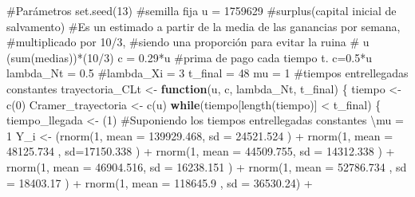 \documentclass[
  us-letterpaper,
]{scrreprt}
\newenvironment{Shaded}{\begin{snugshade}}{\end{snugshade}}
\newcommand{\AttributeTok}[1]{\textcolor[rgb]{0.40,0.45,0.13}{#1}}
\newcommand{\CommentTok}[1]{\textcolor[rgb]{0.37,0.37,0.37}{#1}}
\newcommand{\ControlFlowTok}[1]{\textcolor[rgb]{0.00,0.23,0.31}{\textbf{#1}}}
\newcommand{\DecValTok}[1]{\textcolor[rgb]{0.68,0.00,0.00}{#1}}
\newcommand{\FloatTok}[1]{\textcolor[rgb]{0.68,0.00,0.00}{#1}}
\newcommand{\FunctionTok}[1]{\textcolor[rgb]{0.28,0.35,0.67}{#1}}
\newcommand{\NormalTok}[1]{\textcolor[rgb]{0.00,0.23,0.31}{#1}}
\newcommand{\OtherTok}[1]{\textcolor[rgb]{0.00,0.23,0.31}{#1}}
\newcommand{\SpecialCharTok}[1]{\textcolor[rgb]{0.37,0.37,0.37}{#1}}
\theoremstyle{plain}
\theoremstyle{plain}
\theoremstyle{definition}
\theoremstyle{remark}
\begin{document}
\begin{Shaded}
\begin{Highlighting}[]
\CommentTok{\#Parámetros}
\FunctionTok{set.seed}\NormalTok{(}\DecValTok{13}\NormalTok{) }\CommentTok{\#semilla fija}
\NormalTok{u }\OtherTok{=} \DecValTok{1759629} \CommentTok{\#surplus(capital inicial de salvamento)}
\CommentTok{\#Es un estimado a partir de la media de las ganancias por semana, }
\CommentTok{\#multiplicado por 10/3, }
\CommentTok{\#siendo una proporción para evitar la ruina}
\CommentTok{\# u (sum(medias))*(10/3)}
\NormalTok{c }\OtherTok{=} \FloatTok{0.29}\SpecialCharTok{*}\NormalTok{u }\CommentTok{\#prima de pago cada tiempo t. c=0.5*u}
\NormalTok{lambda\_Nt }\OtherTok{=} \FloatTok{0.5}
\CommentTok{\#lambda\_Xi = 3}
\NormalTok{t\_final }\OtherTok{=} \DecValTok{48}
\NormalTok{mu }\OtherTok{=} \DecValTok{1} \CommentTok{\#tiempos entrellegadas constantes}
\NormalTok{trayectoria\_CLt }\OtherTok{\textless{}{-}} \ControlFlowTok{function}\NormalTok{(u, c, lambda\_Nt, t\_final)}
\NormalTok{\{}
\NormalTok{  tiempo }\OtherTok{\textless{}{-}} \FunctionTok{c}\NormalTok{(}\DecValTok{0}\NormalTok{)}
\NormalTok{  Cramer\_trayectoria }\OtherTok{\textless{}{-}} \FunctionTok{c}\NormalTok{(u)}
  \ControlFlowTok{while}\NormalTok{(tiempo[}\FunctionTok{length}\NormalTok{(tiempo)] }\SpecialCharTok{\textless{}}\NormalTok{ t\_final)}
\NormalTok{  \{}
\NormalTok{    tiempo\_llegada }\OtherTok{\textless{}{-}}\NormalTok{ (}\DecValTok{1}\NormalTok{) }
    \CommentTok{\#Suponiendo los tiempos entrellegadas constantes \textbackslash{}mu = 1}
\NormalTok{    Y\_i }\OtherTok{\textless{}{-}}\NormalTok{  (}\FunctionTok{rnorm}\NormalTok{(}\DecValTok{1}\NormalTok{, }\AttributeTok{mean =} \FloatTok{139929.468}\NormalTok{, }\AttributeTok{sd =} \FloatTok{24521.524}\NormalTok{ ) }\SpecialCharTok{+} 
             \FunctionTok{rnorm}\NormalTok{(}\DecValTok{1}\NormalTok{, }\AttributeTok{mean =} \FloatTok{48125.734}\NormalTok{ , }\AttributeTok{sd=}\FloatTok{17150.338}\NormalTok{ ) }\SpecialCharTok{+}  
             \FunctionTok{rnorm}\NormalTok{(}\DecValTok{1}\NormalTok{, }\AttributeTok{mean =}  \FloatTok{44509.755}\NormalTok{, }\AttributeTok{sd =} \FloatTok{14312.338}\NormalTok{ ) }\SpecialCharTok{+} 
             \FunctionTok{rnorm}\NormalTok{(}\DecValTok{1}\NormalTok{, }\AttributeTok{mean =}   \FloatTok{46904.516}\NormalTok{, }\AttributeTok{sd =} \FloatTok{16238.151}\NormalTok{ ) }\SpecialCharTok{+} 
             \FunctionTok{rnorm}\NormalTok{(}\DecValTok{1}\NormalTok{, }\AttributeTok{mean =} \FloatTok{52786.734}\NormalTok{  , }\AttributeTok{sd =} \FloatTok{18403.17}\NormalTok{ ) }\SpecialCharTok{+} 
             \FunctionTok{rnorm}\NormalTok{(}\DecValTok{1}\NormalTok{, }\AttributeTok{mean =} \FloatTok{118645.9}\NormalTok{  , }\AttributeTok{sd =} \FloatTok{36530.24}\NormalTok{) }\SpecialCharTok{+}

\end{Highlighting}
\end{Shaded}
\end{document}
